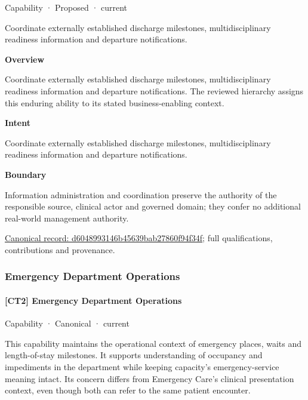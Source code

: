 \label{element:d6048993146b45639bab27860f94f34f}
{\small Capability · Proposed · current}\par

Coordinate externally established discharge milestones, multidisciplinary readiness information and departure notifications.



\textbf{Overview}



Coordinate externally established discharge milestones, multidisciplinary readiness information and departure notifications. The reviewed hierarchy assigns this enduring ability to its stated business-enabling context.



\textbf{Intent}



Coordinate externally established discharge milestones, multidisciplinary readiness information and departure notifications.



\textbf{Boundary}



Information administration and coordination preserve the authority of the responsible source, clinical actor and governed domain; they confer no additional real-world management authority.


{\footnotesize \href{../../../../continuum/strategy/capability/d6048993146b45639bab27860f94f34f.md}{Canonical record: d6048993146b45639bab27860f94f34f}; full qualifications, contributions and provenance.}\par
\subsubsection{Emergency Department Operations}

\paragraph{[CT2] Emergency Department Operations}

\label{element:24a4b5815faa4d369bc756a6e97d3e9e}
{\small Capability · Canonical · current}\par

This capability maintains the operational context of emergency places, waits and length-of-stay milestones. It supports understanding of occupancy and impediments in the department while keeping capacity's emergency-service meaning intact. Its concern differs from Emergency Care's clinical presentation context, even though both can refer to the same patient encounter.




